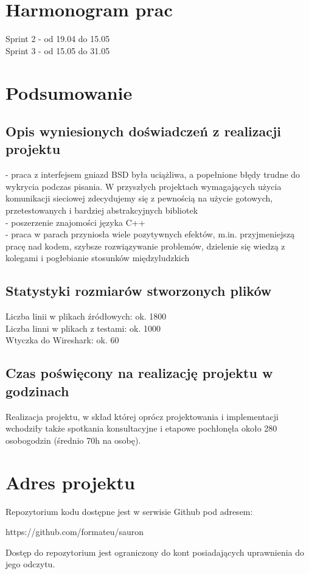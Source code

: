\documentclass[a4paper,11pt]{article}
\begin{document}
\section{Harmonogram prac}
Sprint 2 - od 19.04 do 15.05 \\
Sprint 3 - od 15.05 do 31.05 \\

\section{Podsumowanie}
\subsection{Opis wyniesionych doświadczeń z realizacji projektu}
- praca z interfejsem gniazd BSD była uciążliwa, a popełnione błędy trudne do wykrycia podczas pisania. W przyszłych projektach wymagających użycia komunikacji sieciowej zdecydujemy się z pewnością na użycie gotowych, przetestowanych i bardziej abstrakcyjnych bibliotek \\
- poszerzenie znajomości języka C++ \\
- praca w parach przyniosła wiele pozytywnych efektów, m.in. przyjmeniejszą pracę nad kodem, szybsze rozwiązywanie problemów, dzielenie się wiedzą z kolegami i pogłebianie stosunków międzyludzkich

\subsection{Statystyki rozmiarów stworzonych plików}
Liczba linii w plikach źródłowych: ok. 1800 \\
Liczba linni w plikach z testami: ok. 1000 \\
Wtyczka do Wireshark: ok. 60

\subsection{Czas poświęcony na realizację projektu w godzinach}
Realizacja projektu, w skład której oprócz projektowania i implementacji wchodziły także
spotkania konsultacyjne i etapowe pochłonęła około 280 osobogodzin (średnio 70h na osobę).

\section{Adres projektu}
Repozytorium kodu dostępne jest w serwisie Github pod adresem:
\begin{center}https://github.com/formateu/sauron \end{center}
Dostęp do repozytorium jest ograniczony do kont posiadających uprawnienia do jego odczytu.
\end{document}
